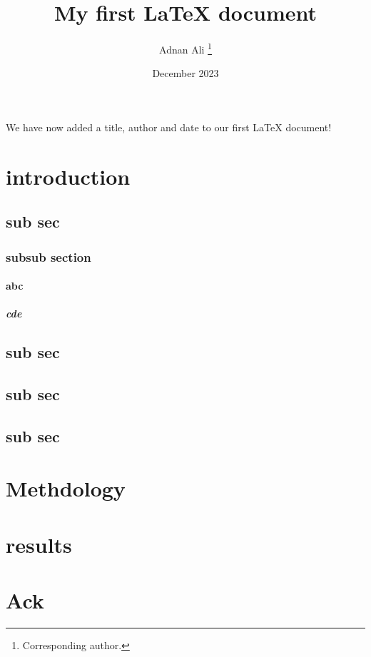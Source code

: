 \documentclass[122pt, a4paper]{article}
\title{My first LaTeX document}
\author{Adnan Ali \thanks{Corresponding author.}}
\date{December 2023}
\begin{document}
\maketitle
We have now added a title, author and date to our first \LaTeX{} document!
\section{introduction}
\subsection{sub sec }
\subsubsection{subsub section }
\paragraph{abc}
\subparagraph{cde}
\subsection{sub sec }
\subsection{sub sec }
\subsection{sub sec }

\section{Methdology}


\section{results}

\section{Ack}
\end{document}
